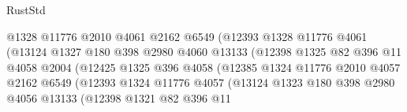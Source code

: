 \begin{lexlean}{RustStd}
\begin{coremodule}
                                      @1328
                                      @11776
                                      @2010
                                      @4061
                                      @2162
                                      @6549
                                      (@12393
                                        @1328
                                        @11776
                                        @4061
                                        (@13124
                                          @1327
                                          @180
                                          @398
                                          @2980
                                          @4060
                                          @13133
                                          (@12398
                                            @1325
                                            @82
                                            @396
                                            @11
                                            @4058
                                            @2004
                                            (@12425
                                              @1325
                                              @396
                                              @4058
                                              (@12385
                                                @1324
                                                @11776
                                                @2010
                                                @4057
                                                @2162
                                                @6549
                                                (@12393
                                                  @1324
                                                  @11776
                                                  @4057
                                                  (@13124
                                                    @1323
                                                    @180
                                                    @398
                                                    @2980
                                                    @4056
                                                    @13133
                                                    (@12398
                                                      @1321
                                                      @82
                                                      @396
                                                      @11

\end{coremodule}
\end{lexlean}
